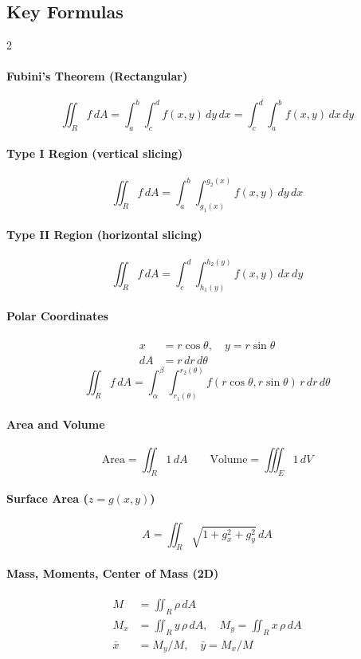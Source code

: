 \subsection*{Key Formulas}
\begin{multicols}{2}

\paragraph{Fubini's Theorem (Rectangular)}
\[
\iint_R f\,dA = \int_a^b\!\int_c^d f(x,y)\,dy\,dx = \int_c^d\!\int_a^b f(x,y)\,dx\,dy
\]

\paragraph{Type I Region (vertical slicing)}
\[
\iint_R f\,dA = \int_a^b\!\int_{g_1(x)}^{g_2(x)} f(x,y)\,dy\,dx
\]

\paragraph{Type II Region (horizontal slicing)}
\[
\iint_R f\,dA = \int_c^d\!\int_{h_1(y)}^{h_2(y)} f(x,y)\,dx\,dy
\]

\paragraph{Polar Coordinates}
\begin{align*}
x &= r\cos\theta, \quad y = r\sin\theta \\
dA &= r\,dr\,d\theta
\end{align*}
\[
\iint_R f\,dA = \int_\alpha^\beta\!\int_{r_1(\theta)}^{r_2(\theta)} f(r\cos\theta,r\sin\theta)\,r\,dr\,d\theta
\]

\paragraph{Area and Volume}
\[
\text{Area} = \iint_R 1\,dA \qquad \text{Volume} = \iiint_E 1\,dV
\]

\paragraph{Surface Area ($z = g(x,y)$)}
\[
A = \iint_R \sqrt{1 + g_x^2 + g_y^2}\,dA
\]

\paragraph{Mass, Moments, Center of Mass (2D)}
\begin{align*}
M &= \iint_R \rho\,dA \\
M_x &= \iint_R y\,\rho\,dA, \quad M_y = \iint_R x\,\rho\,dA \\
\bar{x} &= M_y/M, \quad \bar{y} = M_x/M
\end{align*}


\end{multicols}
